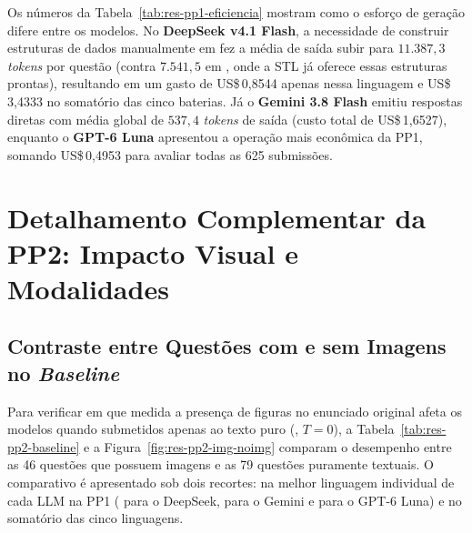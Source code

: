 Os números da Tabela~\ref{tab:res-pp1-eficiencia} mostram como o esforço de geração difere entre os modelos. No \textbf{DeepSeek v4.1 Flash}, a necessidade de construir estruturas de dados manualmente em  fez a média de saída subir para $11.387{,}3$ \textit{tokens} por questão (contra $7.541{,}5$ em , onde a STL já oferece essas estruturas prontas), resultando em um gasto de US\$\,0,8544 apenas nessa linguagem e US\$\,3,4333 no somatório das cinco baterias. Já o \textbf{Gemini 3.8 Flash} emitiu respostas diretas com média global de $537{,}4$ \textit{tokens} de saída (custo total de US\$\,1,6527), enquanto o \textbf{GPT-6 Luna} apresentou a operação mais econômica da PP1, somando US\$\,0,4953 para avaliar todas as 625 submissões.
\FloatBarrier

\section{Detalhamento Complementar da PP2: Impacto Visual e Modalidades}\label{ap:pp2-detalhes}

\subsection{Contraste entre Questões com e sem Imagens no \textit{Baseline}}\label{sec:res-rq2-baseline}

Para verificar em que medida a presença de figuras no enunciado original afeta os modelos quando submetidos apenas ao texto puro (, $T = 0$), a Tabela~\ref{tab:res-pp2-baseline} e a Figura~\ref{fig:res-pp2-img-noimg} comparam o desempenho entre as 46 questões que possuem imagens e as 79 questões puramente textuais. O comparativo é apresentado sob dois recortes: na melhor linguagem individual de cada LLM na PP1 ( para o DeepSeek,  para o Gemini e  para o GPT-6 Luna) e no somatório das cinco linguagens.

